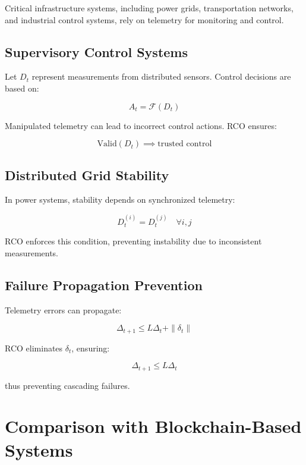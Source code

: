 Critical infrastructure systems, including power grids, transportation networks, and industrial control systems, rely on telemetry for monitoring and control.

\subsection{Supervisory Control Systems}

Let $D_t$ represent measurements from distributed sensors. Control decisions are based on:

\begin{equation}
A_t = \mathcal{F}(D_t)
\end{equation}

Manipulated telemetry can lead to incorrect control actions. RCO ensures:

\begin{equation}
\text{Valid}(D_t) \implies \text{trusted control}
\end{equation}

\subsection{Distributed Grid Stability}

In power systems, stability depends on synchronized telemetry:

\begin{equation}
D_t^{(i)} = D_t^{(j)} \quad \forall i,j
\end{equation}

RCO enforces this condition, preventing instability due to inconsistent measurements.

\subsection{Failure Propagation Prevention}

Telemetry errors can propagate:

\begin{equation}
\Delta_{t+1} \leq L \Delta_t + \|\delta_t\|
\end{equation}

RCO eliminates $\delta_t$, ensuring:

\begin{equation}
\Delta_{t+1} \leq L \Delta_t
\end{equation}

thus preventing cascading failures.

\section{Comparison with Blockchain-Based Systems}

